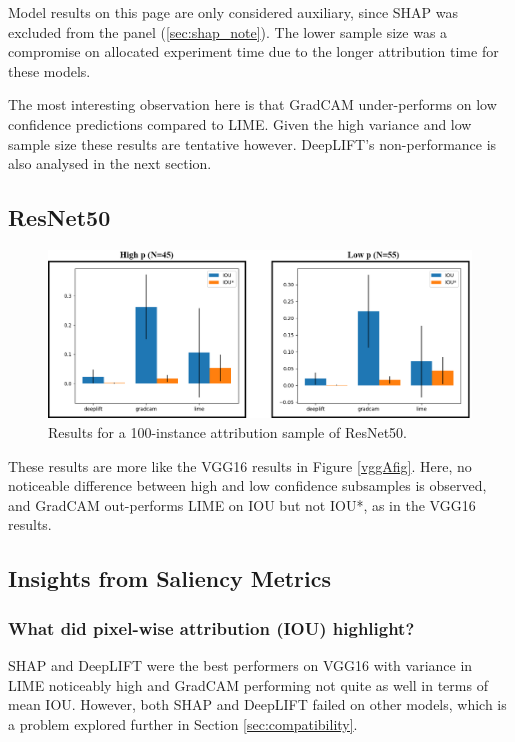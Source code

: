\documentclass[main]{subfiles}
\begin{document}
Model results on this page are only considered auxiliary, since SHAP was excluded from the panel (\ref{sec:shap_note}). The lower sample size was a compromise on allocated experiment time due to the longer attribution time for these models.

The most interesting observation here is that GradCAM under-performs on low confidence predictions compared to LIME. Given the high variance and low sample size these results are tentative however. DeepLIFT's non-performance is also analysed in the next section.

\subsection{ResNet50}

\begin{figure}[h]
\centering
\includegraphics[scale=0.35]{resnet.png}
\caption{Results for a 100-instance attribution sample of ResNet50. }
\label{resnetFig}
\end{figure}

These results are more like the VGG16 results in Figure \ref{vggAfig}. Here, no noticeable difference between high and low confidence subsamples is observed, and GradCAM out-performs LIME on IOU but not IOU*, as in the VGG16 results.


\newpage
\subsection{Insights from Saliency Metrics} \label{sec:saliency_insights}

\subsubsection{What did pixel-wise attribution (IOU) highlight?}
SHAP and DeepLIFT were the best performers on VGG16 with variance in LIME noticeably high and GradCAM performing not quite as well in terms of mean IOU. However, both SHAP and DeepLIFT failed on other models, which is a problem explored further in Section \ref{sec:compatibility}.
\end{document}
